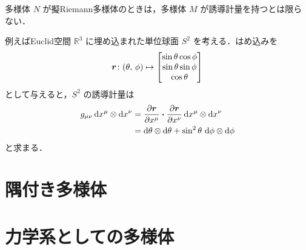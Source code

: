 \documentclass[geometry_main]{subfiles}
\begin{document}
\begin{marker}
	多様体 $N$ が擬Riemann多様体のときは，多様体 $M$ が誘導計量を持つとは限らない．
\end{marker}

例えばEuclid空間 $\mathbb{R}^3$ に埋め込まれた単位球面 $S^2$ を考える．はめ込みを
\begin{align}
	\vb*{r} \colon (\theta,\, \phi) \mapsto \mqty[\sin \theta \cos\phi \\ \sin\theta \sin \phi \\ \cos \theta]
\end{align}
として与えると，$S^2$ の誘導計量は
\begin{align}
	g_{\mu\nu} \dd{x^\mu} \otimes \dd{x^\nu} &= \pdv{\vb*{r}}{x^\mu} \vdot \pdv{\vb*{r}}{x^\nu} \dd{x^\mu} \otimes \dd{x^\nu} \\
	&= \dd{\theta} \otimes \dd{\theta} + \sin^2 \theta\, \dd{\phi} \otimes \dd{\phi}
\end{align}
と求まる．

\section{隅付き多様体}


\section{力学系としての多様体}
\end{document}
